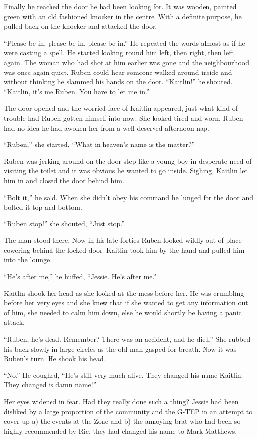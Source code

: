 Finally he reached the door he had been looking for.  It was wooden, painted green with an old fashioned knocker in the centre.  With a definite purpose, he pulled back on the knocker and attacked the door.  

``Please be in, please be in, please be in.''  He repeated the words almost as if he were casting a spell.  He started looking round him left, then right, then left again.  The woman who had shot at him earlier was gone and the neighbourhood was once again quiet.  Ruben could hear someone walked around inside and without thinking he slammed his hands on the door.  ``Kaitlin!'' he shouted.  ``Kaitlin, it's me Ruben.  You have to let me in.''

The door opened and the worried face of Kaitlin appeared, just what kind of trouble had Ruben gotten himself into now.  She looked tired and worn, Ruben had no idea he had awoken her from a well deserved afternoon nap.

``Ruben,'' she started, ``What in heaven's name is the matter?''

Ruben was jerking around on the door step like a young boy in desperate need of visiting the toilet and it was obvious he wanted to go inside.  Sighing, Kaitlin let him in and closed the door behind him.

``Bolt it,'' he said.  When she didn't obey his command he lunged for the door and bolted it top and bottom.

``Ruben stop!'' she shouted, ``Just stop.''

The man stood there.  Now in his late forties Ruben looked wildly out of place cowering behind the locked door.  Kaitlin took him by the hand and pulled him into the lounge.  

``He's after me,'' he huffed, ``Jessie.  He's after me.''  

Kaitlin shook her head as she looked at the mess before her.  He was crumbling before her very eyes and she knew that if she wanted to get any information out of him, she needed to calm him down, else he would shortly be having a panic attack.  

``Ruben, he's dead.  Remember?  There was an accident, and he died.''  She rubbed his back slowly in large circles as the old man gasped for breath.  Now it was Ruben's turn. He shook his head.

``No.''  He coughed, ``He's still very much alive.  They changed his name Kaitlin.  They changed is damn name!''  

Her eyes widened in fear.  Had they really done such a thing?  Jessie had been disliked by a large proportion of the community and the G-TEP in an attempt to cover up a) the events at the Zone and b) the annoying brat who had been so highly recommended by Ric, they had changed his name to Mark Matthews.


